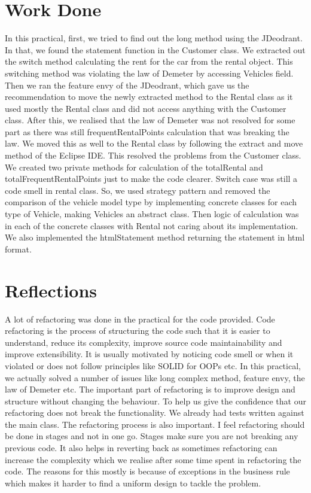 \section{Work Done}

In this practical, first, we tried to find out the long method using the JDeodrant. In that, we found the statement function in the Customer class. We extracted out the switch method calculating the rent for the car from the rental object. This switching method was violating the law of Demeter by accessing Vehicles field. Then we ran the feature envy of the JDeodrant, which gave us the recommendation to move the newly extracted method to the Rental class as it used mostly the Rental class and did not access anything with the Customer class. After this, we realised that the law of Demeter was not resolved for some part as there was still frequentRentalPoints calculation that was breaking the law. We moved this as well to the Rental class by following the extract and move method of the Eclipse IDE. This resolved the problems from the Customer class. We created two private methods for calculation of the totalRental and totalFrequentRentalPoints just to make the code clearer. Switch case was still a code smell in rental class. So, we used strategy pattern and removed the comparison of the vehicle model type by implementing concrete classes for each type of Vehicle, making Vehicles an abstract class. Then logic of calculation was in each of the concrete classes with Rental not caring about its implementation. We also implemented the htmlStatement method returning the statement in html format.

\section{Reflections}

A lot of refactoring was done in the practical for the code provided. Code refactoring is the process of structuring the code such that it is easier to understand, reduce its complexity, improve source code maintainability and improve extensibility. It is usually motivated by noticing code smell or when it violated or does not follow principles like SOLID for OOPs etc. In this practical, we actually solved a number of issues like long complex method, feature envy, the law of Demeter etc. The important part of refactoring is to improve design and structure without changing the behaviour. To help us give the confidence that our refactoring does not break the functionality. We already had tests written against the main class. The refactoring process is also important. I feel refactoring should be done in stages and not in one go. Stages make sure you are not breaking any previous code. It also helps in reverting back as sometimes refactoring can increase the complexity which we realise after some time spent in refactoring the code. The reasons for this mostly is because of exceptions in the business rule which makes it harder to find a uniform design to tackle the problem.

